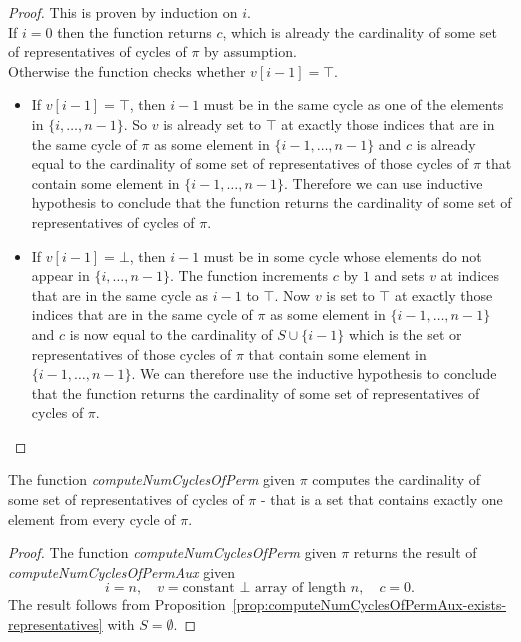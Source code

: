 \begin{proof}
  \leanok
  This is proven by induction on $i$.\\
  If $i = 0$ then the function returns $c$, which is already the cardinality of some set of representatives of cycles of $\pi$ by assumption.\\
  Otherwise the function checks whether $v[i - 1] = \top$.
  \begin{itemize}
    \item If $v[i - 1] = \top$, then $i - 1$ must be in the same cycle as one of the elements in $\{i, \dots, n - 1\}$. So $v$ is already set to $\top$ at exactly those indices that are in the same cycle of $\pi$ as some element in $\{i - 1, \dots, n - 1\}$ and $c$ is already equal to the cardinality of some set of representatives of those cycles of $\pi$ that contain some element in $\{i - 1, \dots, n - 1\}$. Therefore we can use inductive hypothesis to conclude that the function returns the cardinality of some set of representatives of cycles of $\pi$.
    \item If $v[i - 1] = \bot$, then $i - 1$ must be in some cycle whose elements do not appear in $\{i, \dots, n - 1\}$. The function increments $c$ by $1$ and sets $v$ at indices that are in the same cycle as $i - 1$ to $\top$. Now $v$ is set to $\top$ at exactly those indices that are in the same cycle of $\pi$ as some element in $\{i - 1, \dots, n - 1\}$ and $c$ is now equal to the cardinality of $S \cup \{i - 1\}$ which is the set or representatives of those cycles of $\pi$ that contain some element in $\{i - 1, \dots, n - 1\}$. We can therefore use the inductive hypothesis to conclude that the function returns the cardinality of some set of representatives of cycles of $\pi$.
  \end{itemize}
\end{proof}

\begin{proposition}
  \label{prop:computeNumCyclesOfPerm-exists-representatives}
  \leanok
  The function \emph{computeNumCyclesOfPerm} given $\pi$ computes the cardinality of some set of representatives of cycles of $\pi$ - that is a set that contains exactly one element from every cycle of $\pi$.
\end{proposition}

\begin{proof}
  \leanok
  The function \emph{computeNumCyclesOfPerm} given $\pi$ returns the result of \emph{computeNumCyclesOfPermAux} given
  \begin{equation*}
    i = n, \quad v = \text{constant } \bot \text{ array of length } n, \quad c = 0.
  \end{equation*}
  The result follows from Proposition~\ref{prop:computeNumCyclesOfPermAux-exists-representatives} with $S = \emptyset$.
\end{proof}

